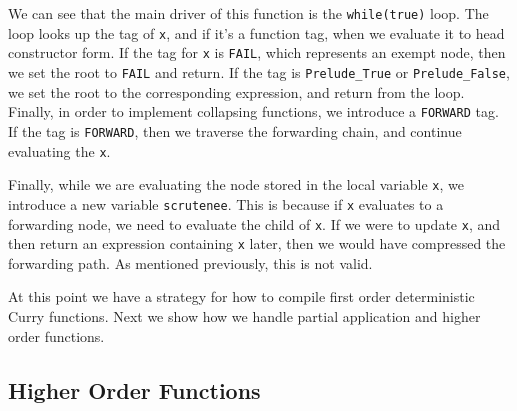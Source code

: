 \documentclass{book}
\theoremstyle{definition}
\begin{document}
We can see that the main driver of this function is the \texttt{while(true)} loop.
The loop looks up the tag of \texttt x, and if it's a function tag, when we evaluate it to
head constructor form.
If the tag for \texttt x is \texttt{FAIL}, which represents an exempt node, then
we set the root to \texttt{FAIL} and return.
If the tag is \texttt{Prelude\_True} or \texttt{Prelude\_False},
we set the root to the corresponding expression, and return from the loop.
Finally, in order to implement collapsing functions, we introduce a \texttt{FORWARD} tag.
If the tag is \texttt{FORWARD}, then we traverse the forwarding chain,
and continue evaluating the \texttt x.

Finally, while we are evaluating the node stored in the local variable \texttt x,
we introduce a new variable \texttt{scrutenee}.
This is because if \texttt{x} evaluates to a forwarding node,
we need to evaluate the child of \texttt x.
If we were to update \texttt x, and then return an expression containing \texttt x
later, then we would have compressed the forwarding path.
As mentioned previously, this is not valid.

At this point we have a strategy for how to compile first order deterministic Curry functions.
Next we show how we handle partial application and higher order functions.

\subsection{Higher Order Functions} \label{Higher Order Functions C}
\end{document}
